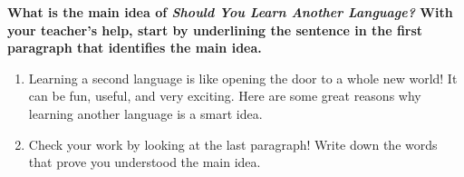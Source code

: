 \documentclass[12pt]{article}
\begin{document}
\begin{tcolorbox}[colframe=black!60, colback=white, 
coltitle=black, colbacktitle=black!15, fonttitle=\bfseries\Large, 
title=Guided Practice, halign title=center, left=10pt, right=10pt, top=10pt, bottom=15pt]
\textbf{What is the main idea of \textit{Should You Learn Another Language?} With your teacher's help, start by underlining the sentence in the first paragraph that identifies the main idea.} 
\vspace{1cm}
\begin{enumerate}[itemsep=4em] %
    \item Learning a second language is like opening the door to a whole new world! It can be fun, useful, and very exciting. Here are some great reasons why learning another language is a smart idea.
    \item Check your work by looking at the last paragraph! Write down the words that prove you understood the main idea.
\\[0.8cm] \underline{\hspace{15cm}}  
    \\[0.8cm] \underline{\hspace{15cm}}  
    \\[0.8cm] \underline{\hspace{15cm}} 




\end{enumerate}
\vspace{2em}
\end{tcolorbox}

\vspace{.5em}
\end{document}
